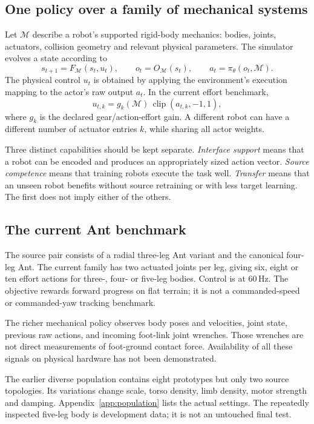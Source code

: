 \documentclass[11pt,letterpaper]{article}
\newcommand{\mech}{\mathcal{M}}
\newcommand{\state}{s}
\newcommand{\policy}{\pi_\theta}
\begin{document}
\subsection{One policy over a family of mechanical systems}
Let $\mech$ describe a robot's supported rigid-body mechanics: bodies, joints,
actuators, collision geometry and relevant physical parameters. The simulator
evolves a state according to
\begin{equation}
  \state_{t+1}=F_{\mech}(\state_t,u_t),\qquad
  o_t=O_{\mech}(\state_t),\qquad
  a_t=\policy(o_t,\mech).
  \label{eq:system}
\end{equation}
The physical control $u_t$ is obtained by applying the environment's execution
mapping to the actor's raw output $a_t$. In the current effort benchmark,
\begin{equation}
  u_{t,k}=g_k(\mech)\,\operatorname{clip}(a_{t,k},-1,1),
  \label{eq:effort}
\end{equation}
where $g_k$ is the declared gear/action-effort gain. A different robot can have a
different number of actuator entries $k$, while sharing all actor weights.

Three distinct capabilities should be kept separate. \emph{Interface support}
means that a robot can be encoded and produces an appropriately sized action
vector. \emph{Source competence} means that training robots execute the task
well. \emph{Transfer} means that an unseen robot benefits without source retraining
or with less target learning. The first does not imply either of the others.

\subsection{The current Ant benchmark}
The source pair consists of a radial three-leg Ant variant and the canonical
four-leg Ant. The current family has two actuated joints per leg, giving six,
eight or ten effort actions for three-, four- or five-leg bodies. Control is at
60\,Hz. The objective rewards forward progress on flat terrain; it is not a
commanded-speed or commanded-yaw tracking benchmark.

The richer mechanical policy observes body poses and velocities, joint state,
previous raw actions, and incoming foot-link joint wrenches. Those wrenches are
not direct measurements of foot-ground contact force. Availability of all these
signals on physical hardware has not been demonstrated.

The earlier diverse population contains eight prototypes but only two source
topologies. Its variations change scale, torso density, limb density, motor
strength and damping. Appendix~\ref{app:population} lists the actual settings.
The repeatedly inspected five-leg body is development data; it is not an
untouched final test.
\end{document}
